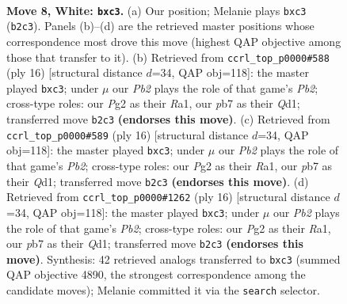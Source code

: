 \documentclass[11pt]{article}
\begin{document}
\begin{figure}[p]\centering
\begin{subfigure}{0.46\textwidth}\centering
\resizebox{\linewidth}{!}{%
\newchessgame
\chessboard[
  setfen={rnbq1rk1/pp3ppp/4pn2/2pp4/2PP4/2bBPN2/PP3PPP/R1BQ1RK1 w - - 0 8},
  showmover=false,
  pgfstyle=straightmove, color=movearrow, markmove={b2-c3}
]}
\caption{}
\end{subfigure}\hfill
\begin{subfigure}{0.46\textwidth}\centering
\resizebox{\linewidth}{!}{%
\newchessgame
\chessboard[
  setfen={r1bq1rk1/pp3ppp/2n1pn2/2pp4/2PP4/P1bBPN2/1P3PPP/R1BQ1RK1 w - - 0 9},
  showmover=false,
  pgfstyle=straightmove, color=movearrow, markmove={b2-c3}
]}
\caption{}
\end{subfigure}
\\[4pt]
\begin{subfigure}{0.46\textwidth}\centering
\resizebox{\linewidth}{!}{%
\newchessgame
\chessboard[
  setfen={r1bq1rk1/pp3ppp/2n1pn2/2pp4/2PP4/P1bBPN2/1P3PPP/R1BQ1RK1 w - - 0 9},
  showmover=false,
  pgfstyle=straightmove, color=movearrow, markmove={b2-c3}
]}
\caption{}
\end{subfigure}\hfill
\begin{subfigure}{0.46\textwidth}\centering
\resizebox{\linewidth}{!}{%
\newchessgame
\chessboard[
  setfen={r1bq1rk1/pp3ppp/2n1pn2/2pp4/2PP4/P1bBPN2/1P3PPP/R1BQ1RK1 w - - 0 9},
  showmover=false,
  pgfstyle=straightmove, color=movearrow, markmove={b2-c3}
]}
\caption{}
\end{subfigure}
\caption{\textbf{Move 8, White: \texttt{bxc3}.} (a) Our position; Melanie plays \texttt{bxc3} (\texttt{b2c3}). Panels (b)--(d) are the retrieved master positions whose correspondence most drove this move (highest QAP objective among those that transfer to it). (b) Retrieved from \texttt{ccrl\_top\_p0000\#588} (ply 16) [structural distance $d$=34, QAP obj=118]: the master played \texttt{bxc3}; under $\mu$ our \emph{Pb2} plays the role of that game's \emph{Pb2}; cross-type roles: our \emph{P}g2 as their \emph{R}a1, our \emph{p}b7 as their \emph{Q}d1; transferred move \texttt{b2c3} \textbf{(endorses this move)}. (c) Retrieved from \texttt{ccrl\_top\_p0000\#589} (ply 16) [structural distance $d$=34, QAP obj=118]: the master played \texttt{bxc3}; under $\mu$ our \emph{Pb2} plays the role of that game's \emph{Pb2}; cross-type roles: our \emph{P}g2 as their \emph{R}a1, our \emph{p}b7 as their \emph{Q}d1; transferred move \texttt{b2c3} \textbf{(endorses this move)}. (d) Retrieved from \texttt{ccrl\_top\_p0000\#1262} (ply 16) [structural distance $d$=34, QAP obj=118]: the master played \texttt{bxc3}; under $\mu$ our \emph{Pb2} plays the role of that game's \emph{Pb2}; cross-type roles: our \emph{P}g2 as their \emph{R}a1, our \emph{p}b7 as their \emph{Q}d1; transferred move \texttt{b2c3} \textbf{(endorses this move)}. Synthesis: 42 retrieved analogs transferred to \texttt{bxc3} (summed QAP objective 4890, the strongest correspondence among the candidate moves); Melanie committed it via the \texttt{search} selector.}
\label{fig:thought-m14}
\end{figure}
\end{document}
